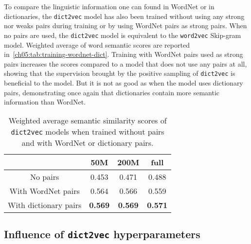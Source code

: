     To compare the linguistic information one can found in WordNet or in
    dictionaries, the \texttt{dict2vec} model has also been trained without
    using any strong nor weaks pairs during training or by using WordNet pairs
    as strong pairs. When no pairs are used, the \texttt{dict2vec} model is
    equivalent to the \texttt{word2vec} Skip-gram model. Weighted average of
    word semantic scores are reported
    in~\autoref{ch05:tab:training-wordnet-dict}. Training with WordNet pairs
    used as strong pairs increases the scores compared to a model that does not
    use any pairs at all, showing that the supervision brought by the positive
    sampling of \texttt{dict2vec} is beneficial to the model. But it is not as
    good as when the model uses dictionary pairs, demonstrating once again that
    dictionaries contain more semantic information than WordNet.

    \begin{table}[htb]
      \centering
      \begin{tabular}{cccc}
                              &  50M  &  200M & full \\
        \toprule
        No pairs              & 0.453 & 0.471 & 0.488 \\
        With WordNet pairs    & 0.564 & 0.566 & 0.559 \\
        With dictionary pairs & \bf{0.569} & \bf{0.569} & \bf{0.571} \\
        \bottomrule
      \end{tabular}
      \caption[Semantic similarity scores when using pairs from WordNet or
      dictionaries.]{Weighted average semantic similarity scores of
      \texttt{dict2vec} models when trained without pairs and with WordNet or
      dictionary pairs.}
      \label{ch05:tab:training-wordnet-dict}
    \end{table}

  \subsection{Influence of \texttt{dict2vec} hyperparameters}
    \label{ch05:subsec:d2v-hyperparameters}
